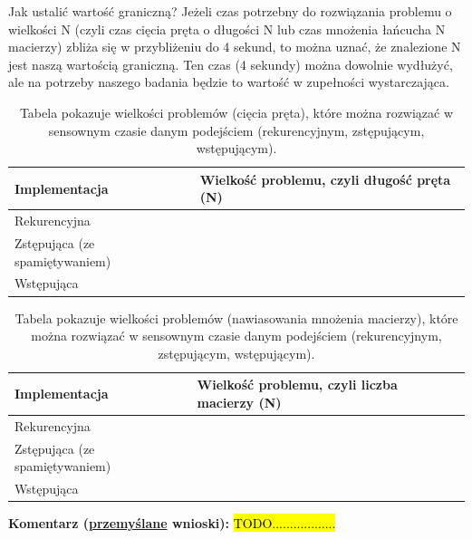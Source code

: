 \documentclass[twoside]{article}
\begin{document}
Jak ustalić wartość graniczną? Jeżeli czas potrzebny do rozwiązania problemu o wielkości N (czyli 
czas cięcia pręta o długości N lub czas mnożenia łańcucha N macierzy) zbliża się w przybliżeniu
do 4 sekund, to można uznać, że znalezione N jest naszą wartością graniczną.
Ten czas (4 sekundy) można dowolnie wydłużyć, ale na potrzeby naszego badania będzie 
to wartość w zupełności wystarczająca.

\begin{table}[h]
\centering
\begin{tabular}{|l|p{4cm}|}
\hline
\textbf{Implementacja}         & \textbf{Wielkość problemu, czyli długość pręta (N)} \\ \hline
Rekurencyjna                   &                                                     \\ \hline
Zstępująca (ze spamiętywaniem) &                                                     \\ \hline
Wstępująca                     &                                                     \\ \hline
\end{tabular}
\caption{Tabela pokazuje wielkości problemów (cięcia pręta), które można rozwiązać w sensownym czasie danym podejściem (rekurencyjnym, zstępującym, wstępującym).}
\label{table:rod_cutter_results}
\end{table}

\begin{table}[h]
\centering
\begin{tabular}{|l|p{4cm}|}
\hline
\textbf{Implementacja}         & \textbf{Wielkość problemu, czyli liczba macierzy (N)} \\ \hline
Rekurencyjna                   &                                                       \\ \hline
Zstępująca (ze spamiętywaniem) &                                                       \\ \hline
Wstępująca                     &                                                       \\ \hline
\end{tabular}
\caption{Tabela pokazuje wielkości problemów (nawiasowania mnożenia macierzy), które można rozwiązać w sensownym czasie danym podejściem (rekurencyjnym, zstępującym, wstępującym).}
\label{table:matrix_chain_results}
\end{table}

\textbf{Komentarz (\underline{przemyślane} wnioski):} \hl{TODO..................}
\end{document}
